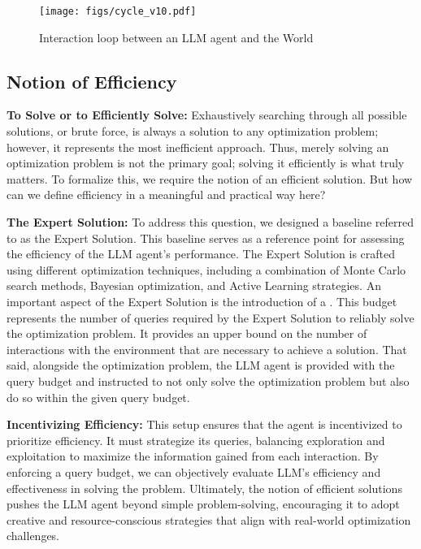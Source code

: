 \begin{figure}[!t]
\begin{center}
\centerline{
\texttt{[image: figs/cycle\_v10.pdf]}
}
\caption{Interaction loop between an LLM agent and the World}
\label{fig:interactive_cycle}
\end{center}
\vskip -0.4in
\end{figure}


\subsection{Notion of Efficiency}
\textbf{To Solve or to Efficiently Solve:}
Exhaustively searching through all possible solutions, or brute force, is always a solution to any optimization problem; however, it represents the most inefficient approach. Thus, merely solving an optimization problem is not the primary goal; solving it efficiently is what truly matters. To formalize this, we require the notion of an efficient solution. But how can we define efficiency in a meaningful and practical way here? 

\textbf{The Expert Solution:}
To address this question, we designed a baseline referred to as the Expert Solution. This baseline serves as a reference point for assessing the efficiency of the LLM agent's performance. The Expert Solution is crafted using different optimization techniques, including a combination of Monte Carlo search methods, Bayesian optimization, and Active Learning strategies. 
An important aspect of the Expert Solution is the introduction of a . This budget represents the number of queries required by the Expert Solution to reliably solve the optimization problem. It provides an upper bound on the number of interactions with the environment that are necessary to achieve a solution. That said, alongside the optimization problem, the LLM agent is provided with the query budget and instructed to not only solve the optimization problem but also do so within the given query budget.

\textbf{Incentivizing Efficiency:}
This setup ensures that the agent is incentivized to prioritize efficiency. It must strategize its queries, balancing exploration and exploitation to maximize the information gained from each interaction. By enforcing a query budget, we can objectively evaluate LLM's efficiency and effectiveness in solving the problem. Ultimately, the notion of efficient solutions pushes the LLM agent beyond simple problem-solving, encouraging it to adopt creative and resource-conscious strategies that align with real-world optimization challenges.

